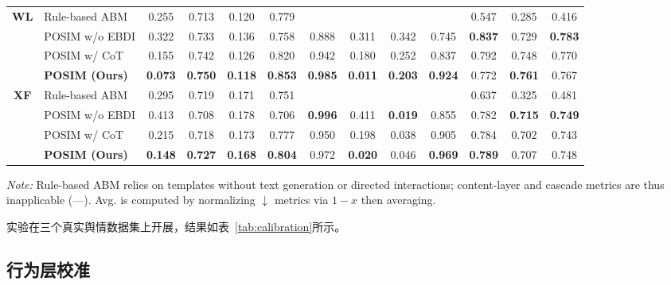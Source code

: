 \documentclass[11pt]{article}
\newcommand{\best}[1]{\textbf{#1}}
\newcommand{\na}{\text{---}}
\begin{document}
\begin{CJK}{UTF8}{gbsn}
\begin{table}[!htbp]
{\begin{tabular}{@{}cl cccc cccc ccc@{}}
\midrule

\multirow{4}{*}{\textbf{WL}}
& Rule-based ABM        & 0.255 & 0.713 & 0.120 & 0.779 & \na & \na & \na & \na & 0.547 & 0.285 & 0.416 \\
& POSIM w/o EBDI        & 0.322 & 0.733 & 0.136 & 0.758 & 0.888 & 0.311 & 0.342 & 0.745 & \best{0.837} & 0.729 & \best{0.783} \\
& POSIM w/ CoT          & 0.155 & 0.742 & 0.126 & 0.820 & 0.942 & 0.180 & 0.252 & 0.837 & 0.792 & 0.748 & 0.770 \\
\rowcolor{oursrow}
& \textbf{POSIM (Ours)}  & \best{0.073} & \best{0.750} & \best{0.118} & \best{0.853} & \best{0.985} & \best{0.011} & \best{0.203} & \best{0.924} & 0.772 & \best{0.761} & 0.767 \\

\midrule

\multirow{4}{*}{\textbf{XF}}
& Rule-based ABM        & 0.295 & 0.719 & 0.171 & 0.751 & \na & \na & \na & \na & 0.637 & 0.325 & 0.481 \\
& POSIM w/o EBDI        & 0.413 & 0.708 & 0.178 & 0.706 & \best{0.996} & 0.411 & \best{0.019} & 0.855 & 0.782 & \best{0.715} & \best{0.749} \\
& POSIM w/ CoT          & 0.215 & 0.718 & 0.173 & 0.777 & 0.950 & 0.198 & 0.038 & 0.905 & 0.784 & 0.702 & 0.743 \\
\rowcolor{oursrow}
& \textbf{POSIM (Ours)}  & \best{0.148} & \best{0.727} & \best{0.168} & \best{0.804} & 0.972 & \best{0.020} & 0.046 & \best{0.969} & \best{0.789} & 0.707 & 0.748 \\

\bottomrule
\end{tabular}%
}
\vspace{1pt}
{\scriptsize \textit{Note:} Rule-based ABM relies on templates without text generation or directed interactions; content-layer and cascade metrics are thus inapplicable (---). Avg. is computed by normalizing $\downarrow$ metrics via $1{-}x$ then averaging.}
\end{table}


实验在三个真实舆情数据集上开展，结果如表~\ref{tab:calibration}所示。

\subsection{行为层校准}


\end{CJK}
\end{document}
